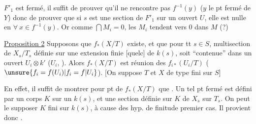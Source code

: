 $F'_1$ est fermé, il suffit de prouver qu'il ne rencontre pas $f^{-1}(y)$ ($y$ le pt fermé de $Y$) donc de prouver que si $s$ est une section de $F'_1$ sur un ouvert $U$, elle est nulle en $\forall\ x\in f^{-1}(y)$. Or comme $\bigcap M_i=0$, les $M_i$ tendent vers $0$ dans $M$ (?)


\uline{Proposition 2} Supposons que $f_*(X/T)$ existe, et que pour tt $s\in S$,  multisection de $X_s/T_s$ définie sur une extension finie  [quelc] de $k(s)$, soit ``contenue'' dans un ouvert  $U_i\otimes k'$ ($U_i$, ). Alors $f_*(X/T)$ est réunion des $f_{i*}(U_i/T)$ ($\unsure{f_i=f(U_i)|f_i=f\vert U_i}$).
[On suppose $T$ et $X$ de type fini sur $S$]

En effet,  il suffit de montrer pour  pt  de $f_*(X/T)$ que .
Un tel pt fermé est défini par un corps $K$ sur un $k(s)$, et une section définie sur $K$ de $X_s$ sur $T_s$. On peut le supposer  $K$ fini sur $k(s)$, à cause des hyp. de finitude   premier cas. Il provient donc \unsure{---}.

